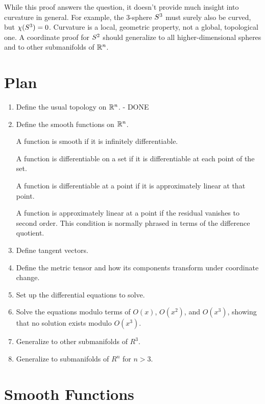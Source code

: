 \documentclass[11pt, oneside]{article}
\begin{document}
While this proof answers the question, it doesn't provide much insight into curvature in general.
For example, the 3-sphere $S^3$ must surely also be curved, but $\chi(S^3) = 0$.
Curvature is a local, geometric property, not a global, topological one.
A coordinate proof for $S^2$ should generalize to all higher-dimensional spheres and to other submanifolds of $\mathbb{R}^n$.

\section{Plan}

\begin{enumerate}

\item Define the usual topology on $\mathbb{R}^n$. - DONE

\item Define the smooth functions on $\mathbb{R}^n$.

A function is smooth if it is infinitely differentiable.

A function is differentiable on a set if it is differentiable at each point of the set.

A function is differentiable at a point if it is approximately linear at that point.

A function is approximately linear at a point if the residual vanishes to second order.
This condition is normally phrased in terms of the difference quotient.

\item Define tangent vectors.

\item Define the metric tensor and how its components transform under coordinate change.

\item Set up the differential equations to solve.

\item Solve the equations modulo terms of $O(x)$, $O(x^2)$, and $O(x^3)$, showing that no solution exists
modulo $O(x^3)$.

\item Generalize to other submanifolds of $R^3$.

\item Generalize to submanifolds of $R^n$ for $n > 3$.

\end{enumerate}

\section{Smooth Functions}
\end{document}
